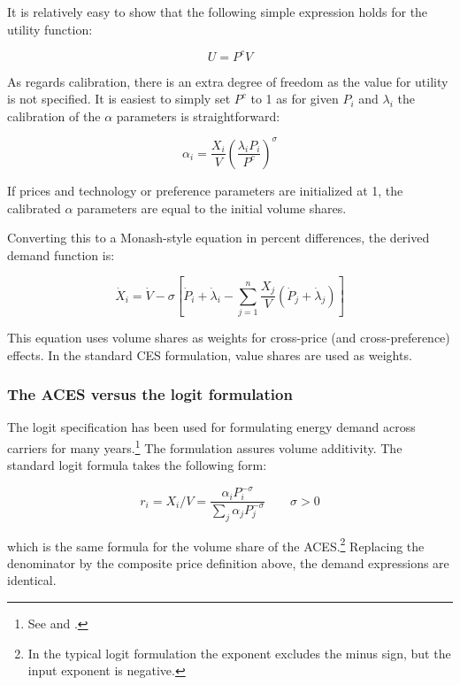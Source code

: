 It is relatively easy to show that the following simple expression holds for the utility function:

\begin{equation}
\label{eq:UAlloc}
U=P^cV
\end{equation}

As regards calibration, there is an extra degree of freedom as the value for utility is not
specified. It is easiest to simply set $P^c$ to 1 as for given $P_i$ and $\lambda_i$ the calibration of
the $\alpha$ parameters is straightforward:

\begin{displaymath}
\alpha_i = \frac{X_i}{V} {\left( \frac {\lambda_i P_i} {P^c} \right)}^{\sigma}
\end{displaymath}

\noindent If prices and technology or preference parameters are initialized at 1, the calibrated $\alpha$ parameters are equal to the initial volume shares.

Converting this to a Monash-style equation in percent differences, the derived demand function is:

\begin{displaymath}
{\dot X}_i = {\dot V} - \sigma \left[ {\dot P}_i + {\dot \lambda}_i
- \sum\limits_{j = 1}^n {\frac{X_j}{V}
\left( {\dot P}_j + {\dot \lambda}_j \right) } \right]
\end{displaymath}

\noindent This equation uses volume shares as weights for cross-price (and cross-preference) effects.
In the standard CES formulation, value shares are used as weights.

\subsubsection{The ACES versus the logit formulation}

The logit specification has been used for formulating energy demand across
carriers for many years.\footnote{See \cite{EdmondsReilly1985} and \cite{MiniCAM2003}.}
The formulation assures volume additivity. The standard logit formula takes
the following form:

\[
r_i = X_i/V = \frac{\alpha_i P_i^{-\sigma}} {\sum_j{\alpha_j P_j^{-\sigma}}} \qquad \sigma > 0
\]

\noindent which is the same formula for the volume share of the ACES.\footnote{In the typical
logit formulation the exponent excludes the minus sign, but the input exponent is
negative.} Replacing
the denominator by the composite price definition above, the demand
expressions are identical.

